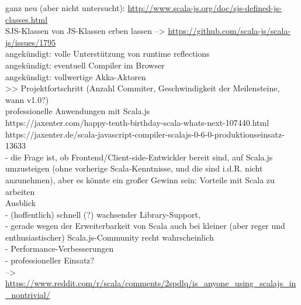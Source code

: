 \documentclass[a4paper, 12pt, hidelinks, listof=totoc, listoftables=totoc, bibliography=totoc]{scrreprt}
\begin{document}
	ganz neu (aber nicht untersucht): \url{http://www.scala-js.org/doc/sjs-defined-js-classes.html} \\
	SJS-Klassen von JS-Klassen erben lassen  -->  \url{https://github.com/scala-js/scala-js/issues/1795} \\
	
	
	angekündigt: volle Unterstützung von runtime reflections\cite[S. 2]{doeraene2013.TDI} \\
	angekündigt: eventuell Compiler im Browser\cite[Folie 39, Min. 39]{doeraene2014.WHB} \\
	angekündigt: vollwertige Akka-Aktoren\cite[Folie 39, Min. 39]{doeraene2014.WHB} \\
	
	>> Projektfortschritt (Anzahl Commiter, Geschwindigkeit der Meilensteine, wann v1.0?) \\


professionelle Anwendungen mit Scala.js \\

		https://jaxenter.com/happy-tenth-birthday-scala-whats-next-107440.html \\
	https://jaxenter.de/scala-javascript-compiler-scalajs-0-6-0-produktionseinsatz-13633 \\
	- die Frage ist, ob Frontend/Client-side-Entwickler bereit sind, auf Scala.js umzusteigen (ohne vorherige Scala-Kenntnisse, und die sind i.d.R. nicht anzunehmen), aber es könnte ein großer Gewinn sein: Vorteile mit Scala zu arbeiten\cite{doeraene2013.CSJ} \\




Ausblick \\
  - (hoffentlich) schnell (?) wachsender Library-Support,  \\
     	- gerade wegen der Erweiterbarkeit von Scala auch bei kleiner (aber reger und enthusiastischer) Scala.js-Community  recht wahrscheinlich \\
  - Performance-Verbesserungen \\
  - professioneller Einsatz? \\
    -->  \url{https://www.reddit.com/r/scala/comments/2spdlq/is_anyone_using_scalajs_in_nontrivial/} \\





\end{document}
